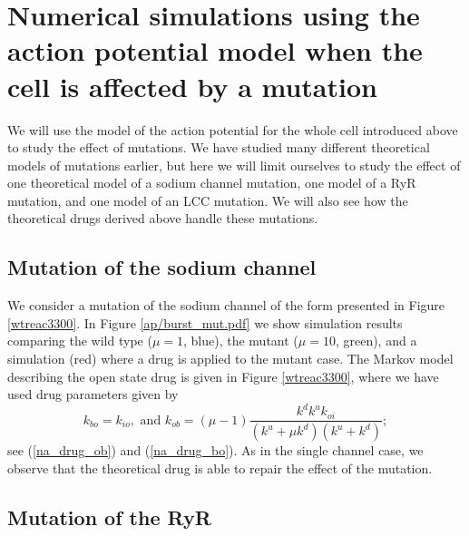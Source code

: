 



\section[Numerical action potential; mutations]{Numerical simulations using the action potential model when the cell is affected by a mutation}

We will use the model of the action potential for the whole cell introduced above to study the effect of mutations. We have studied many different theoretical models of mutations earlier, but here we will limit ourselves to study the effect of one theoretical model of a sodium channel mutation, one model of a RyR mutation, and one model of an LCC mutation. We will also see how the theoretical drugs derived above handle these mutations.




\subsection{Mutation of the sodium channel}

We consider a mutation of the sodium channel of the form presented in Figure \ref{wtreac3300}. 
In Figure \ref{ap/burst_mut.pdf} we show simulation results comparing the wild type ($\mu=1$, blue),
the mutant ($\mu=10$, green), and a simulation (red) where  a drug is applied to the mutant case.
The Markov model describing the open state drug is given
in Figure \ref{wtreac3300}, where we have used drug parameters given by
\[
k_{bo} = k_{io}, \mbox{\ and \ }
k_{ob}=\left(  \mu-1\right)  \frac{k^{d}k^{u}k_{oi}}{\left(  k^{u}+\mu
k^{d}\right)  \left(  k^{u}+k^{d}\right)  };%
\]
see (\ref{na_drug_ob}) and (\ref{na_drug_bo}).
As in the single channel case, we observe that the theoretical drug is able to repair the effect of the mutation. 








\subsection{Mutation of the RyR}


